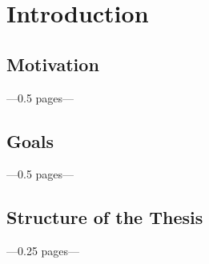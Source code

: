 \chapter{Introduction}
\label{cha:Introduction}

\section{Motivation}
---0.5 pages---

\section{Goals}
---0.5 pages---

\section{Structure of the Thesis}
---0.25 pages---
